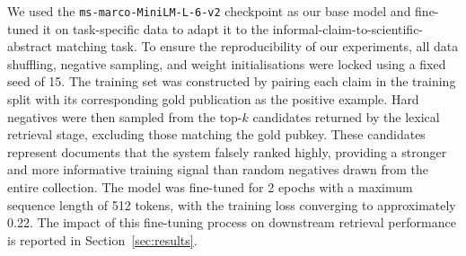 We used the \texttt{ms-marco-MiniLM-L-6-v2} checkpoint as our base model and fine-tuned it on task-specific data to adapt it to the informal-claim-to-scientific-abstract matching task. To ensure the reproducibility of our experiments, all data shuffling, negative sampling, and weight initialisations were locked using a fixed seed of 15. The training set was constructed by pairing each claim in the training split with its corresponding gold publication as the positive example. Hard negatives were then sampled from the top-$k$ candidates returned by the lexical retrieval stage, excluding those matching the gold pubkey. These candidates represent documents that the system falsely ranked highly, providing a stronger and more informative training signal than random negatives drawn from the entire collection. The model was fine-tuned for 2 epochs with a maximum sequence length of 512 tokens, with the training loss converging to approximately 0.22. The impact of this fine-tuning process on downstream retrieval performance is reported in Section~\ref{sec:results}.

